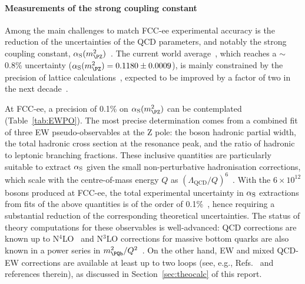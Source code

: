 \paragraph{Measurements of the strong coupling constant}

Among the main challenges to match FCC-ee experimental accuracy is
the reduction of the uncertainties of the QCD parameters,
and notably the strong coupling constant, $\as(m^2_{\PZ})$~\cite{dEnterria:2022hzv}.
The current world average~\cite{ParticleDataGroup:2024cfk}, 
which reaches a $\sim$\,0.8\% uncertainty ($\as(m^2_{\PZ}) = 0.1180 \pm 0.0009$), 
is mainly constrained by the precision of lattice calculations~\cite{FlavourLatticeAveragingGroupFLAG:2021npn}, 
expected to be improved by a factor of two in the next decade~\cite{DallaBrida:2019wur,DelDebbio:2021ryq}.

At FCC-ee, a precision of 0.1\% on $\as(m^2_{\PZ})$ can be contemplated (Table~\ref{tab:EWPO}). 
The most precise determination comes from a combined fit of three EW pseudo-observables at the Z pole: 
the \PZ boson hadronic partial width,
the total hadronic cross section at the resonance peak, 
and the ratio of hadronic to leptonic branching fractions.
These inclusive quantities are particularly suitable to extract $\alpha_{\rm S}$ 
given the small non-perturbative hadronisation corrections,
which scale with the centre-of-mass energy $Q$ as $(\Lambda_\text{QCD} / Q)^6$~\cite{Dokshitzer:1995qm}.
With the $6 \times 10^{12}$ \PZ bosons produced at FCC-ee, 
the total experimental uncertainty in $\alpha_{\rm S}$ extractions from fits of the above quantities 
is of the order of 0.1\%~\cite{dEnterria:2020cpv}, 
hence requiring a substantial reduction of the corresponding theoretical uncertainties.
The status of theory computations for these observables is well-advanced:
QCD corrections are known up to N$^4$LO~\cite{Baikov:2008jh,Baikov:2012er,Herzog:2017dtz} 
and N$^3$LO corrections for massive bottom quarks are also known in a power series in $m_{\PQb}^2 / Q^2$~\cite{Chetyrkin:2000zk}.
On the other hand, EW and mixed QCD-EW corrections are available at least up to two loops 
(see, e.g., Refs.~\cite{Dubovyk:2018rlg,Dubovyk:2019szj,Chen:2020xot} and references therein), 
as discussed in Section~\ref{sec:theocalc} of this report.

